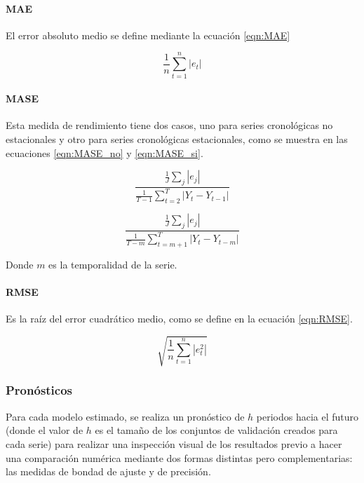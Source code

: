 \documentclass[
]{article}
\begin{document}
\paragraph{MAE}

El error absoluto medio se define mediante la ecuación \ref{eqn:MAE}

\begin{equation}
\label{eqn:MAE}
\frac{1}{n}\sum_{t=1}^n |e_t|
\end{equation}

\paragraph{MASE}

Esta medida de rendimiento tiene dos casos, uno para series cronológicas
no estacionales y otro para series cronológicas estacionales, como se
muestra en las ecuaciones \ref{eqn:MASE_no} y \ref{eqn:MASE_si}.

\begin{equation}
\label{eqn:MASE_no}
\frac{\frac{1}{J}\sum_j|e_j|}{\frac{1}{T-1}\sum_{t=2}^T|Y_t-Y_{t-1}|}
\end{equation}

\begin{equation}
\label{eqn:MASE_si}
\frac{\frac{1}{J}\sum_j|e_j|}{\frac{1}{T-m}\sum_{t=m+1}^T|Y_t-Y_{t-m}|}
\end{equation}

Donde \(m\) es la temporalidad de la serie.

\paragraph{RMSE}

Es la raíz del error cuadrático medio, como se define en la ecuación
\ref{eqn:RMSE}.

\begin{equation}
\label{eqn:RMSE}
\sqrt{\frac{1}{n}\sum_{t=1}^n |e_t^2|}
\end{equation}

\subsubsection{Pronósticos}

Para cada modelo estimado, se realiza un pronóstico de \(h\) periodos
hacia el futuro (donde el valor de \(h\) es el tamaño de los conjuntos
de validación creados para cada serie) para realizar una inspección
visual de los resultados previo a hacer una comparación numérica
mediante dos formas distintas pero complementarias: las medidas de
bondad de ajuste y de precisión.
\end{document}

